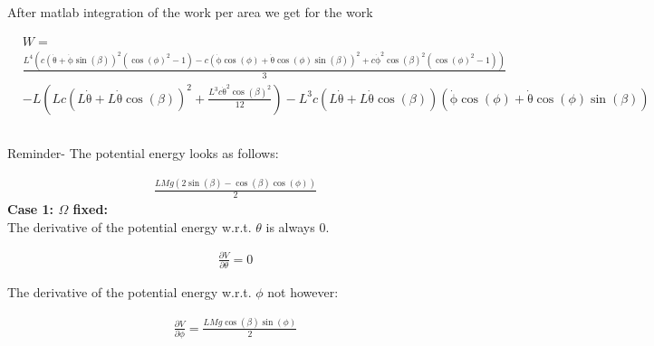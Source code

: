 After matlab integration of the work per area we get for the work

\begin{equation}
    \begin{split}
        &W = \\
        &\frac{L^4\left(c{\left(\mathrm{\dot\theta}+\mathrm{\dot\phi}\sin\left(\beta \right)\right)}^2\left({\cos\left(\phi \right)}^2-1\right)-c{\left(\mathrm{\dot\phi}\cos\left(\phi \right)+\mathrm{\dot\theta}\cos\left(\phi \right)\sin\left(\beta \right)\right)}^2+c{\mathrm{\dot\phi}}^2{\cos\left(\beta \right)}^2\left({\cos\left(\phi \right)}^2-1\right)\right)}{3}\\
        &-L\left(Lc{\left(L\mathrm{\dot\theta}+L\mathrm{\dot\theta}\cos\left(\beta \right)\right)}^2+\frac{L^3c{\mathrm{\dot\theta}}^2{\cos\left(\beta \right)}^2}{12}\right)-L^3c\left(L\mathrm{\dot\theta}+L\mathrm{\dot\theta}\cos\left(\beta \right)\right)\left(\mathrm{\dot\phi}\cos\left(\phi \right)+\mathrm{\dot\theta}\cos\left(\phi \right)\sin\left(\beta \right)\right)
    \end{split}
\end{equation}


\subsection{}
Reminder- The potential energy looks as follows:

\begin{equation}
    \begin{split}
        \frac{LMg\left(2\sin\left(\beta \right)-\cos\left(\beta \right)\cos\left(\phi \right)\right)}{2}
    \end{split}
\end{equation}
\textbf{Case 1: $\Omega$ fixed:} \vspace{0.5cm}\\

The derivative of the potential energy w.r.t. $\theta$ is always 0.

\begin{equation}
    \begin{split}
        \frac{\partial V}{\partial \theta} = 0
    \end{split}
\end{equation}

The derivative of the potential energy w.r.t. $\phi$ not however:

\begin{equation}
    \begin{split}
        \frac{\partial V}{\partial \phi} = \frac{LMg\cos\left(\beta \right)\sin\left(\phi \right)}{2}
    \end{split}
\end{equation}

